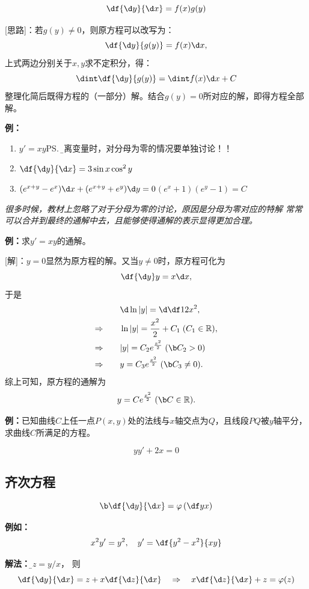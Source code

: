 $${\df{\d y}{\d x}=f(x)g(y)}$$ 

[思路]：若$g(y)\ne 0$，则原方程可以改写为：
$$\df{\d y}{g(y)}=f(x)\d x,$$ 
上式两边分别关于$x,y$求不定积分，得：
$$\dint\df{\d y}{g(y)}=\dint f(x)\d x+C$$ 
整理化简后既得方程的（一部分）解。结合$g(y)=0$所对应的解，即得方程全部解。

{\bf 例：}
\begin{enumerate}[(1)]
  \setlength{\itemindent}{1cm}
  \item $y'=xy$\ps{\b 分离变量时，对分母为零的情况要单独讨论！！}
  \item $\df{\d y}{\d x}=3\sin x\cos^2 y$
  \item $(e^{x+y}-e^x)\d x+(e^{x+y}+e^y)\d y=0$\hfill $(e^x+1)(e^y-1)=C$
\end{enumerate}

\begin{shaded}
	{\b\it 很多时候，教材上忽略了对于分母为零的讨论，原因是分母为零对应的特解
	常常可以合并到最终的通解中去，且能够使得通解的表示显得更加合理。}
	
	{\bf 例：}求$y'=xy$的通解。
	
	[解]：$y=0$显然为原方程的解。又当$y\ne0$时，原方程可化为
	$$\df{\d y}y=x\d x,$$
	于是
	\begin{align*}
		&  \quad\d\ln|y|=\d\df12x^2,\\
		\Rightarrow\quad & \quad\ln|y|={\frac{x^2}2}+C_1\;(C_1\in\mathbb{R}),\\
		\Rightarrow\quad & \quad|y|=C_2e^{\frac{x^2}2}\;({\b C_2>0})\\
		\Rightarrow\quad & \quad y=C_3e^{\frac{x^2}2}\;({\b C_3\ne0}).
	\end{align*}
	综上可知，原方程的通解为
	$$y=Ce^{\frac{x^2}2}\;({\b C\in\mathbb{R}}).$$
\end{shaded}

{\bf 例：}已知曲线$C$上任一点$P(x,y)$处的法线与$x$轴交点为$Q$，且线段$PQ$被$y$轴平分，
求曲线$C$所满足的方程。

$$yy'+2x=0$$

\subsection{齐次方程}

$${\b\df{\d y}{\d x}=\varphi\left(\df yx\right)}$$

{\bf 例如：}
$$x^2y'=y^2,\quad y'=\df{y^2-x^2}{xy}$$ 

{\bf 解法：}令{\b$z=y/x$}， 则
$$\df{\d y}{\d x}=z+x\df{\d z}{\d x}\quad\Rightarrow\quad
x\df{\d z}{\d x}+z=\varphi(z)$$

